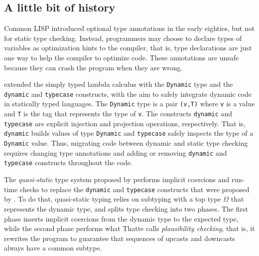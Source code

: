 \documentclass[preprint]{sig-alternate}
\begin{document}
\subsection{A little bit of history}

Common LISP \citep{steele1982ocl} introduced optional type annotations
in the early eighties, but not for static type checking.
Instead, programmers may choose to declare types of variables as
optimization hints to the compiler, that is, type declarations are
just one way to help the compiler to optimize code.
These annotations are unsafe because they can crash the program
when they are wrong.

\citet{abadi1989dts} extended the simply typed lambda calculus with the
\texttt{Dynamic} type and the \texttt{dynamic} and \texttt{typecase}
constructs, with the aim to safely integrate dynamic code in
statically typed languages.
The \texttt{Dynamic} type is a pair \texttt{(v,T)} where \texttt{v} is a
value and \texttt{T} is the tag that represents the type of \texttt{v}.
The constructs \texttt{dynamic} and \texttt{typecase} are explicit
injection and projection operations, respectively.
That is, \texttt{dynamic} builds values of type \texttt{Dynamic} and
\texttt{typecase} safely inspects the type of a \texttt{Dynamic} value.
Thus, migrating code between dynamic and static type checking requires
changing type annotations and adding or removing \texttt{dynamic} and
\texttt{typecase} constructs throughout the code.

The \textit{quasi-static} type system proposed by \citet{thatte1990qst}
performs implicit coercions and run-time checks to replace the
\texttt{dynamic} and \texttt{typecase} constructs that were proposed by
\citet{abadi1989dts}.
To do that, quasi-static typing relies on subtyping with a top type
$\Omega$ that represents the dynamic type, and splits type checking
into two phases.
The first phase inserts implicit coercions from the dynamic type to
the expected type, while the second phase performs what Thatte calls
\textit{plausibility checking}, that is, it rewrites the program to
guarantee that sequences of upcasts and downcasts always have a
common subtype.
\end{document}
